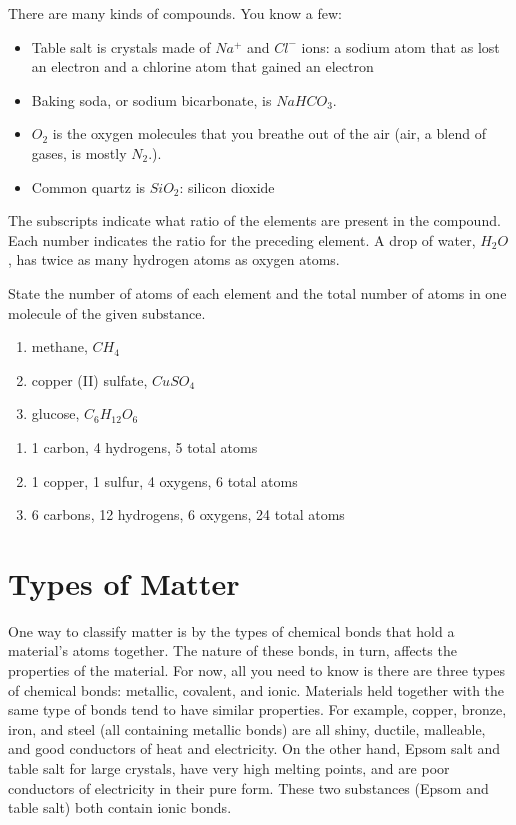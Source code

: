 There are many kinds of compounds. You know a few:
\begin{itemize}
\item Table salt is crystals made of $Na^{+}$ and $Cl^{-}$ ions: a sodium atom 
that as lost an electron and a chlorine atom that gained an electron
\item Baking soda, or sodium bicarbonate, is $NaHCO_3$.
\item $O_2$ is the oxygen molecules that you breathe out of the air (air, a
blend of gases, is mostly $N_2$.).
\item Common quartz is $SiO_2$: silicon dioxide
\end{itemize}

The subscripts indicate what ratio of the elements are present in the compound. 
Each number indicates the ratio for the preceding element. A drop of water, 
$H_2O$, has twice as many hydrogen atoms as oxygen atoms. 


\begin{Exercise}[title = {Numbers of Atoms in Molecules}, label = num_atom]
State the number of atoms of each element and the total number of atoms in one
molecule of the given substance.
\begin{enumerate}
\item methane, $CH_4$
\item copper (II) sulfate, $CuSO_4$
\item glucose, $C_6H_{12}O_6$
\end{enumerate}
\end{Exercise}

\begin{Answer}[ref = num_atom]
\begin{enumerate}
\item 1 carbon, 4 hydrogens, 5 total atoms
\item 1 copper, 1 sulfur, 4 oxygens, 6 total atoms
\item 6 carbons, 12 hydrogens, 6 oxygens, 24 total atoms
\end{enumerate}
\end{Answer}

\section{Types of Matter}
One way to classify matter is by the types of chemical bonds that hold a 
material's atoms together. The nature of these bonds, in turn, affects the 
properties of the material. For now, all you need to know is there are three types
of chemical bonds: metallic, covalent, and ionic. Materials held together with the
same type of bonds tend to have similar properties. For example, copper, bronze, 
iron, and steel (all containing metallic bonds) are all shiny, ductile, malleable,
and good conductors of heat and electricity. On the other hand, Epsom salt and 
table salt for large crystals, have very high melting points, and are poor 
conductors of electricity in their pure form. These two substances (Epsom and 
table salt) both contain ionic bonds. 

